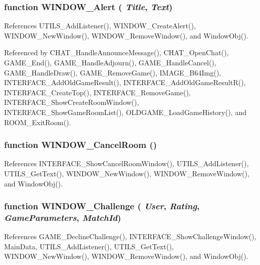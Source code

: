 \subsubsection{\setlength{\rightskip}{0pt plus 5cm}function WINDOW\_\-Alert ( {\em Title}, \/   {\em Text})}\label{window_2window_8js_a1b10eccd2c596a7a41b95bc3a55c851}




References UTILS\_\-AddListener(), WINDOW\_\-CreateAlert(), WINDOW\_\-NewWindow(), WINDOW\_\-RemoveWindow(), and WindowObj().

Referenced by CHAT\_\-HandleAnnounceMessage(), CHAT\_\-OpenChat(), GAME\_\-End(), GAME\_\-HandleAdjourn(), GAME\_\-HandleCancel(), GAME\_\-HandleDraw(), GAME\_\-RemoveGame(), IMAGE\_\-B64Img(), INTERFACE\_\-AddOldGameResult(), INTERFACE\_\-AddOldGameResultR(), INTERFACE\_\-CreateTop(), INTERFACE\_\-RemoveGame(), INTERFACE\_\-ShowCreateRoomWindow(), INTERFACE\_\-ShowGameRoomList(), OLDGAME\_\-LoadGameHistory(), and ROOM\_\-ExitRoom().
\subsubsection{\setlength{\rightskip}{0pt plus 5cm}function WINDOW\_\-CancelRoom ()}\label{window_2window_8js_03cf2ff49b3e97f239cdb0eb00189f75}




References INTERFACE\_\-ShowCancelRoomWindow(), UTILS\_\-AddListener(), UTILS\_\-GetText(), WINDOW\_\-NewWindow(), WINDOW\_\-RemoveWindow(), and WindowObj().
\subsubsection{\setlength{\rightskip}{0pt plus 5cm}function WINDOW\_\-Challenge ( {\em User}, \/   {\em Rating}, \/   {\em GameParameters}, \/   {\em MatchId})}\label{window_2window_8js_fce69c99efa3a722eba86a87121ae114}




References GAME\_\-DeclineChallenge(), INTERFACE\_\-ShowChallengeWindow(), MainData, UTILS\_\-AddListener(), UTILS\_\-GetText(), WINDOW\_\-NewWindow(), WINDOW\_\-RemoveWindow(), and WindowObj().

